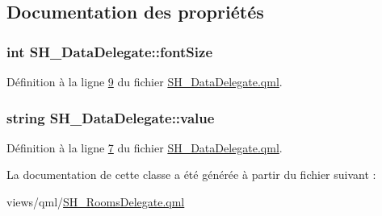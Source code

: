 \subsection{Documentation des propriétés}
\hypertarget{classSH__DataDelegate_afbb41ad9b513c7f27e7b5ad90d82e95b}{
\subsubsection[{font\-Size}]{\setlength{\rightskip}{0pt plus 5cm}int S\-H\-\_\-\-Data\-Delegate\-::font\-Size\hspace{0.3cm}{\ttfamily [inherited]}}}\label{classSH__DataDelegate_afbb41ad9b513c7f27e7b5ad90d82e95b}


Définition à la ligne \hyperlink{SH__DataDelegate_8qml_source_l00009}{9} du fichier \hyperlink{SH__DataDelegate_8qml_source}{S\-H\-\_\-\-Data\-Delegate.\-qml}.

\hypertarget{classSH__DataDelegate_acb9da3c73493c88865e08d9575f26482}{
\subsubsection[{value}]{\setlength{\rightskip}{0pt plus 5cm}string S\-H\-\_\-\-Data\-Delegate\-::value\hspace{0.3cm}{\ttfamily [inherited]}}}\label{classSH__DataDelegate_acb9da3c73493c88865e08d9575f26482}


Définition à la ligne \hyperlink{SH__DataDelegate_8qml_source_l00007}{7} du fichier \hyperlink{SH__DataDelegate_8qml_source}{S\-H\-\_\-\-Data\-Delegate.\-qml}.



La documentation de cette classe a été générée à partir du fichier suivant \-:\begin{DoxyCompactItemize}
\item 
views/qml/\hyperlink{SH__RoomsDelegate_8qml}{S\-H\-\_\-\-Rooms\-Delegate.\-qml}\end{DoxyCompactItemize}
